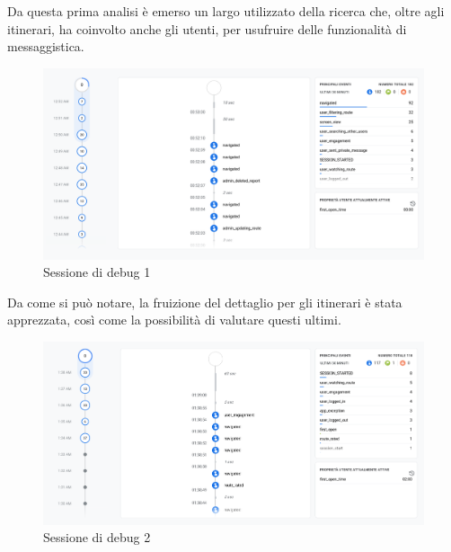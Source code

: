 \documentclass{natourDoc}
\begin{document}
Da questa prima analisi è emerso un largo utilizzato della ricerca che, oltre agli itinerari, ha coinvolto anche 
gli utenti, per usufruire delle funzionalità di messaggistica.
\begin{figure}[!htbp]
	\centering
	\includegraphics[width=\textwidth]{./analytics/debug-mario.png}
	\caption{Sessione di debug 1}
\end{figure}
\FloatBarrier

\newpage

Da come si può notare, la fruizione del dettaglio per gli itinerari è stata apprezzata,
così come la possibilità di valutare questi ultimi.
\begin{figure}[!htbp]
	\centering
	\includegraphics[width=\textwidth]{./analytics/debug-emu1.png}
	\caption{Sessione di debug 2}
\end{figure}
\FloatBarrier
\end{document}

